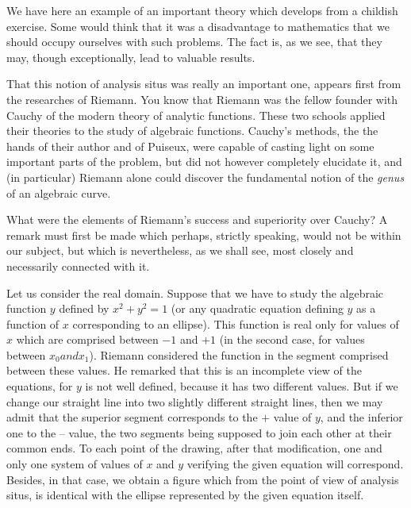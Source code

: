 \documentclass[12pt,oneside]{book}
\begin{document}
We have here an example of an important theory which develops from a childish exercise. Some would think that it was a disadvantage to mathematics that we should occupy ourselves with such problems. The fact is, as we see, that they may, though exceptionally, lead to valuable results. \par

That this notion of analysis situs was really an important one, appears first from the researches of Riemann. You know that Riemann was the fellow founder with Cauchy of the modern theory of analytic functions. These two schools applied their theories to the study of algebraic functions. Cauchy's methods, the the hands of their author and of Puiseux, were capable of casting light on some important parts of the problem, but did not however completely elucidate it, and (in particular) Riemann alone could discover the fundamental notion of the \textit{genus} of an algebraic curve. \par

What were the elements of Riemann's success and superiority over Cauchy? A remark must first be made which perhaps, strictly speaking, would not be within our subject, but which is nevertheless, as we shall see, most closely and necessarily connected with it. \par

Let us consider the real domain. Suppose that we have to study the algebraic function $y$ defined by $x^2+y^2=1$ (or any quadratic equation defining $y$ as a function of $x$ corresponding to an ellipse). This function is real only for values of $x$ which are comprised between $-1$ and $+1$ (in the second case, for values between $x_0 and x_1$). Riemann considered the function in the segment comprised between these values. He remarked that this is an incomplete view of the equations, for $y$ is not well defined, because it has two different values. But if we change our straight line into two slightly different straight lines, then we may admit that the superior segment corresponds to the $+$ value of $y$, and the inferior one to the -- value, the two segments being supposed to join each other at their common ends. To each point of the drawing, after that modification, one and only one system of values of $x$ and $y$ verifying the given equation will correspond. Besides, in that case, we obtain a figure which from the point of view of analysis situs, is identical with the ellipse represented by the given equation itself. \par
\end{document}
